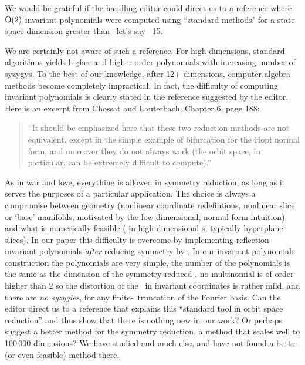 \documentclass[12pt]{article}
\begin{document}
We would be grateful if the handling editor could direct us to a
reference where $\textrm{O}(2)$ invariant polynomials were computed using
``standard methods" for a state space dimension greater than --let's say-- 15.

We are certainly not aware of such a reference.  For high dimensions, standard
algorithms yields higher and higher order polynomials with increasing
number of syzygys. To the best of our knowledge, after 12+ dimensions,
computer algebra methods become completely impractical.
In fact, the difficulty of computing invariant polynomials is clearly
stated in the reference suggested by the editor. Here is an excerpt
from Chossat and Lauterbach, Chapter 6, page 188:

\begin{quote}
``It should be emphasized here that these two reduction methods are
not equivalent, except in the simple example of bifurcation for the Hopf
normal form, and moreover they do not always work (the orbit space, in
particular, can be extremely difficult to compute).''
\end{quote}

As in war and love, everything is allowed in symmetry reduction, as long
as it serves the purposes of a particular application. The choice is
always a compromise between geometry (nonlinear coordinate redefintions,
nonlinear slice or `base' manifolds, motivated by the low-dimensional,
normal form intuition) and what is numerically feasible ( in
high-dimensional \statesp s, typically hyperplane slices). In our paper
this difficulty is overcome by implementing reflection-invariant
polynomials \emph{after} reducing  symmetry by \mslices.
In our invariant polynomials construction the polynomials are very
simple, the number of the polynomials is the same as the dimension of the
symmetry-reduced \statesp, no multinomial is of order higher than 2 so
the distortion of the \statesp\ in invariant coordinates is rather mild,
and there are \emph{no syzygies}, for any finite-\dmn\ truncation of the
Fourier basis.
Can the editor direct us to a reference that explains this ``standard
tool in orbit space reduction'' and thus show that there is nothing new
in our work? Or perhaps suggest a better method for the 
symmetry reduction, a method that scales well to 100\,000 dimensions?
We have studied
and much else, and have not found a better (or even feasible) method there.
\end{document}
